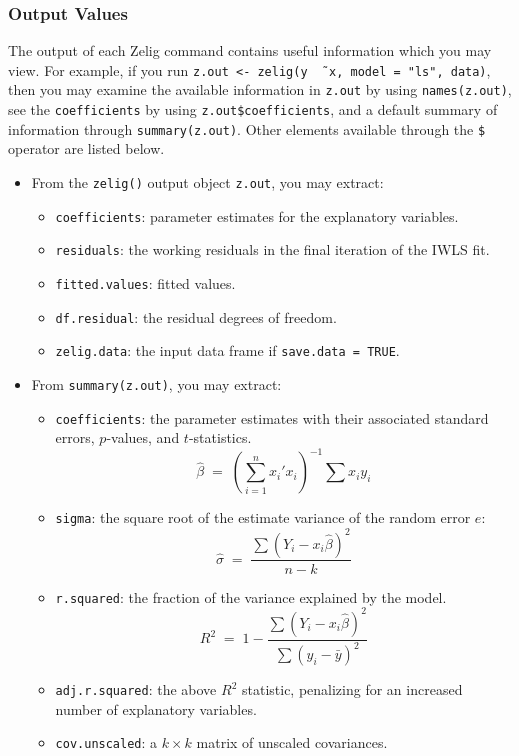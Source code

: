 \subsubsection{Output Values}

The output of each Zelig command contains useful information which you
may view.  For example, if you run \texttt{z.out <- zelig(y \~\,
  x, model = "ls", data)}, then you may examine the available
information in \texttt{z.out} by using \texttt{names(z.out)},
see the {\tt coefficients} by using {\tt z.out\$coefficients}, and
a default summary of information through \texttt{summary(z.out)}.
Other elements available through the {\tt \$} operator are listed
below.

\begin{itemize}
  \item From the {\tt zelig()} output object {\tt z.out}, you may
  extract:
   \begin{itemize}
   \item {\tt coefficients}: parameter estimates for the explanatory
     variables.
   \item {\tt residuals}: the working residuals in the final iteration
     of the IWLS fit.
   \item {\tt fitted.values}: fitted values.
   \item {\tt df.residual}: the residual degrees of freedom.
   \item {\tt zelig.data}: the input data frame if {\tt save.data = TRUE}.  
   \end{itemize}
  
\item From {\tt summary(z.out)}, you may extract:
   \begin{itemize}
   \item {\tt coefficients}: the parameter estimates with their
     associated standard errors, $p$-values, and $t$-statistics.
     \begin{equation*}
       \hat{\beta} \; = \; \left(\sum_{i=1}^n x_i' x_i\right)^{-1} \sum x_i y_i
     \end{equation*}
   \item {\tt sigma}: the square root of the estimate variance of the
     random error $e$:
     \begin{equation*}
       \hat{\sigma} \; = \; \frac{\sum (Y_i-x_i\hat{\beta})^2}{n-k}
     \end{equation*}
   \item {\tt r.squared}: the fraction of the variance explained by
     the model. 
     \begin{equation*}
       R^2 \; = \; 1 - \frac{\sum (Y_i-x_i\hat{\beta})^2}{\sum (y_i -
         \bar{y})^2} 
     \end{equation*}
   \item {\tt adj.r.squared}: the above $R^2$ statistic, penalizing
     for an increased number of explanatory variables.  
   \item{\tt cov.unscaled}: a $k \times k$ matrix of unscaled
     covariances.  
   \end{itemize}
   

\end{itemize}
